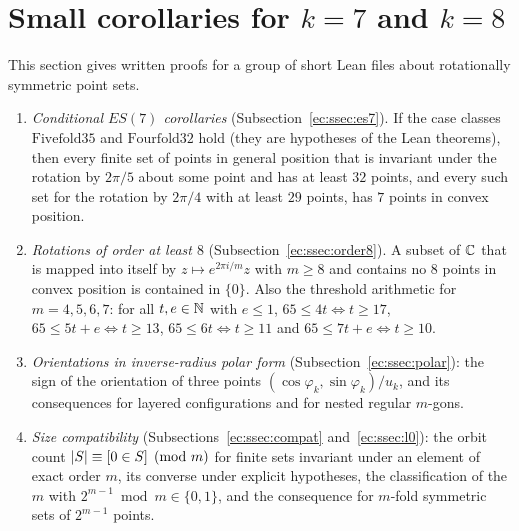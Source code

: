 \section{Small corollaries for \texorpdfstring{$k=7$}{k=7} and \texorpdfstring{$k=8$}{k=8}}\label{ec:sec}
\begingroup\sloppy

This section gives written proofs for a group of short Lean files about rotationally symmetric point sets.
\begin{enumerate}[label=(\arabic*)]
\item \emph{Conditional $ES(7)$ corollaries} (Subsection~\ref{ec:ssec:es7}). If the case classes
  $\mathrm{Fivefold35}$ and $\mathrm{Fourfold32}$ hold (they are hypotheses of the Lean theorems), then every finite
  set of points in general position that is invariant under the rotation by $2\pi/5$ about some point and has at
  least $32$ points, and every such set for the rotation by $2\pi/4$ with at least $29$ points, has $7$ points in
  convex position.
\item \emph{Rotations of order at least $8$} (Subsection~\ref{ec:ssec:order8}). A subset of $\mathbb C$ that is mapped into
  itself by $z\mapsto e^{2\pi i/m}z$ with $m\ge8$ and contains no $8$ points in convex position is contained in
  $\{0\}$. Also the threshold arithmetic for $m=4,5,6,7$: for all $t,e\in\mathbb N$ with $e\le1$, $65\le4t\iff t\ge17$,
  $65\le5t+e\iff t\ge13$, $65\le6t\iff t\ge11$ and $65\le7t+e\iff t\ge10$.
\item \emph{Orientations in inverse-radius polar form} (Subsection~\ref{ec:ssec:polar}): the sign of the orientation of
  three points $(\cos\varphi_k,\sin\varphi_k)/u_k$, and its consequences for layered configurations and for nested
  regular $m$-gons.
\item \emph{Size compatibility} (Subsections~\ref{ec:ssec:compat} and~\ref{ec:ssec:l0}): the orbit count
  $\lvert S\rvert\equiv[0\in S]\pmod m$ for finite sets invariant under an element of exact order $m$, its converse under
  explicit hypotheses, the classification of the $m$ with $2^{m-1}\bmod m\in\{0,1\}$, and the consequence for
  $m$-fold symmetric sets of $2^{m-1}$ points.
\end{enumerate}

